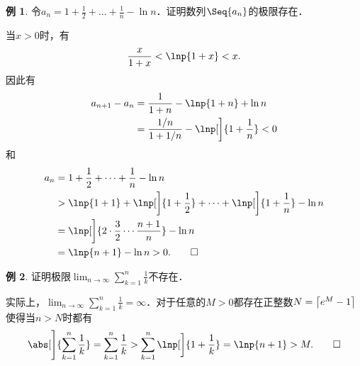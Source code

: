 \documentclass[a4paper,punct=CCT]{ctexbook}
\makeatletter
\theoremstyle{definition}
\newtheorem*{example*}{例}
\theoremstyle{remark}
\renewenvironment{proof}[1][\proofname]{\par
  \pushQED{\qed}%
  \normalfont \topsep6\p@\@plus6\p@\relax
  \trivlist
  \item[]\ignorespaces
}{%
  \popQED\endtrivlist\@endpefalse
}
\makeatother
\begin{document}
\begin{example*}
  令\(\displaystyle a_n = 1 + \frac12 + \dots + \frac1n - \ln n\)．证明数列\(\Seq{a_n}\)的极限存在．\rule{0ex}{3.5ex}

  \begin{proof}
    当\(x > 0\)时，有
    \begin{equation*}
      \frac{x}{1+x} < \lnp{1+x} < x.
    \end{equation*}
    因此有
    \begin{align*}
      a_{n+1} - a_n
      &= \frac{1}{1+n} - \lnp{1+n} + \ln n \\
      &= \frac{1/n}{1+1/n} - \lnp[\bigg]{1+\frac1n} < 0
    \end{align*}
    和
    \begin{align*}
      a_n
      &= 1 + \frac12 + \dots + \frac1n - \ln n \\
      &> \lnp{1+1} + \lnp[\bigg]{1+\frac12} + \dots + \lnp[\bigg]{1+\frac1n} - \ln n \\
      &= \lnp[\bigg]{2 \cdot \frac32 \dotsm \frac{n+1}{n}} - \ln n \\
      &= \lnp{n + 1} - \ln n > 0. \qedhere
    \end{align*}
  \end{proof}
\end{example*}

\begin{example*}
  证明极限\(\displaystyle \lim_{n\to\infty} \sum_{k=1}^n \frac1k\)不存在．

  \begin{proof}
    实际上，\(\displaystyle \lim_{n\to\infty} \sum_{k=1}^n \frac1k = \infty\)．对于任意的\(M > 0\)都存在正整数\(N = \ceil[\big]{e^M-1}\)使得当\(n > N\)时都有
    \begin{equation*}
      \abs[\Bigg]{\sum_{k=1}^n \frac1k}
      = \sum_{k=1}^n \frac1k
      > \sum_{k=1}^n \lnp[\bigg]{1+\frac1k}
      = \lnp{n+1} > M.
      \qedhere
    \end{equation*}
  \end{proof}
\end{example*}
\end{document}
